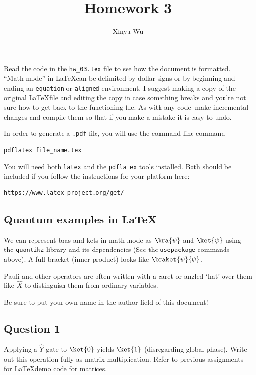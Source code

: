 \documentclass{article}
\title{Homework 3}
\author{Xinyu Wu}
\date{}
\begin{document}
\maketitle %

Read the code in the \texttt{hw\_03.tex} file to see how the document is formatted. ``Math mode'' in \LaTeX  can be delimited by dollar signs or by beginning and ending an \texttt{equation} or \texttt{aligned} environment. I suggest making a copy of the original \LaTeX file and editing the copy in case something breaks and you're not sure how to get back to the functioning file. As with any code, make incremental changes and compile them so that if you make a mistake it is easy to undo.

In order to generate a \texttt{.pdf} file, you will use the command line command

\begin{verbatim}
pdflatex file_name.tex
\end{verbatim}

You will need both \texttt{latex} and the \texttt{pdflatex} tools installed. Both should be included if you follow the instructions for your platform here:

\begin{verbatim}
https://www.latex-project.org/get/
\end{verbatim}

\subsection*{Quantum examples in \LaTeX}

We can represent bras and kets in math mode as $\bra{\psi}$ and $\ket{\psi}$ using the \texttt{quantikz} library and its dependencies (See the \texttt{usepackage} commands above). A full bracket (inner product) looks like $\braket{\psi}{\psi}$.

Pauli and other operators are often written with a caret or angled `hat' over them like $\hat{X}$ to distinguish them from ordinary variables.

Be sure to put your own name in the author field of this document!

\subsection*{Question 1}

Applying a $\hat{Y}$ gate to $\ket{0}$ yields $\ket{1}$ (disregarding global phase). Write out this operation fully as matrix multiplication. Refer to previous assignments for \LaTeX demo code for matrices.
\end{document}

